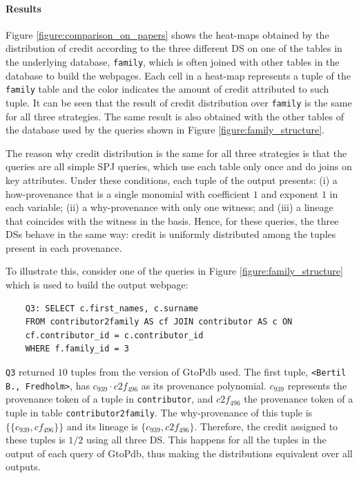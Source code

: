 \paragraph{Results} Figure \ref{figure:comparison_on_papers} shows the heat-maps obtained by the distribution of credit according to the three different DS on one of the tables in the underlying database, \texttt{family}, 
which is often joined with other tables in the database to build the webpages. \textcolor{correction}{Each cell in a heat-map represents a tuple of the \texttt{family} table and the color indicates the amount of credit attributed to such tuple.}
It can be seen that the result of  credit distribution over \texttt{family} is the same for all three strategies. The same result is also obtained with the other tables of the database used by the queries shown in Figure \ref{figure:family_structure}. 

The reason why credit distribution is the same for all three strategies is that the queries are all simple SPJ queries, which use each table only once and do joins on key attributes. 
Under these conditions, each tuple of the output presents: (i) a how-provenance that is a single monomial with coefficient $1$ and exponent $1$ in each variable; (ii) a why-provenance with only one witness; and (iii) a lineage that coincides with the witness in the basis.
Hence, for these queries, the three DSs behave in the same way: credit is uniformly distributed among the tuples present in each provenance. 

To illustrate this, consider one of the queries in Figure \ref{figure:family_structure} which is used to build the output webpage:

\vspace{2mm}
{\footnotesize
\begin{adjustwidth}{25pt}{5pt}
	\begin{verbatim}
	Q3: SELECT c.first_names, c.surname
	FROM contributor2family AS cf JOIN contributor AS c ON 
	cf.contributor_id = c.contributor_id 
	WHERE f.family_id = 3
\end{verbatim}
\end{adjustwidth}
}
\vspace{2mm}

\texttt{Q3} returned $10$ tuples from the version of GtoPdb used. 
The first tuple, \texttt{<Bertil B., Fredholm>}, has  $c_{939} \cdot c2f_{496}$ as its provenance polynomial.
$c_{939}$ represents the provenance token of a tuple in \texttt{contributor}, and $c2f_{496}$ the provenance token of a tuple in table \texttt{contributor2family}. 
The why-provenance of this tuple is $\{\{c_{939}, cf_{496} \}\}$ and its lineage is $\{c_{939}, c2f_{496} \}$.
Therefore, the credit assigned to these tuples is $1/2$ using all three DS.
This happens for all the tuples in the output of each query of GtoPdb, thus making the distributions equivalent over all outputs.

